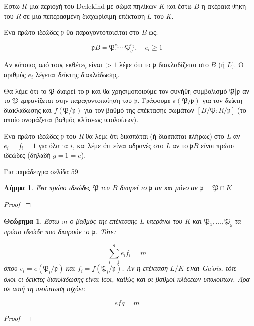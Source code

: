 \documentclass[oneside,a4paper]{article}
\newtheorem{theorem}{Θεώρημα}
\newtheorem{lemma}{Λήμμα}
\newcommand {\tl}{\textlatin}
\begin{document}
Έστω $R$ μια περιοχή του \tl{Dedekind} με σώμα πηλίκων $K$ και έστω $B$ η ακέραια θήκη του $R$ σε μια πεπερασμένη διαχωρίσιμη επέκταση $L$ του $K$.

Ένα πρώτο ιδεώδες $\mathfrak{p}$ θα παραγοντοποιείται στο $B$ ως:

$$\mathfrak{p} B = \mathfrak{P}^{e_1}_1 \cdots \mathfrak{P}^{e_g}_g,\quad e_i \geq 1$$

Αν κάποιος από τους εκθέτες είναι $>1$ λέμε ότι το $\mathfrak{p}$ διακλαδίζεται στο $B$ (ή $L$). Ο αριθμός $e_i$ λέγεται δείκτης διακλάδωσης.

Θα λέμε ότι το $\mathfrak{P}$ διαιρεί το $\mathfrak{p}$ και θα χρησιμοποιούμε τον συνήθη συμβολισμό $\mathfrak{P} | \mathfrak{p}$ αν το $\mathfrak{P}$ εμφανίζεται στην παραγοντοποίηση του $\mathfrak{p}$. Γράφουμε $e(\mathfrak{P}/\mathfrak{p})$ για τον δείκτη διακλάδωσης και $f(\mathfrak{P}/\mathfrak{p})$ για τον βαθμό της επέκτασης σωμάτων $[B/\mathfrak{P} : R/\mathfrak{p}]$ (το οποίο ονομάζεται βαθμός κλάσεως υπολοίπων).

Ένα πρώτο ιδεώδες $\mathfrak{p}$ του $R$ θα λέμε ότι διασπάται (ή διασπάται πλήρως) στο $L$ αν $e_i = f_i = 1$ για όλα τα $i$, και λέμε ότι είναι αδρανές στο $L$ αν το $\mathfrak{p} B$ είναι πρώτο ιδεώδες (δηλαδή $g=1=e$).


Για παράδειγμα σελίδα 59


\begin{lemma}
	Ένα πρώτο ιδεώδες $\mathfrak{P}$ του $B$ διαιρεί το $\mathfrak{p}$ αν και μόνο αν $\mathfrak{p} = \mathfrak{P}\cap K$.

\end{lemma}

\begin{proof}
\end{proof}


\begin{theorem}
	Έστω $m$ ο βαθμός της επέκτασης $L$ υπεράνω του $K$ και $\mathfrak{P}_1,\ldots,\mathfrak{P}_g$ τα πρώτα ιδεώδη που διαιρούν το $\mathfrak{p}$. Τότε:

	$$\sum\limits_{i=1}^g e_i f_i = m$$ όπου $e_i = e(\mathfrak{P}_i/\mathfrak{p})$ και $f_i = f(\mathfrak{P}_i/\mathfrak{p})$. Αν η επέκταση $L/K$ είναι \tl{Galois}, τότε όλοι οι δείκτες διακλάδωσης είναι ίσοι, καθώς και οι βαθμοί κλάσεων υπολοίπων. Άρα σε αυτή τη περίπτωση ισχύει:

	$$efg = m$$
\end{theorem}

\begin{proof} %
\end{proof}
\end{document}
